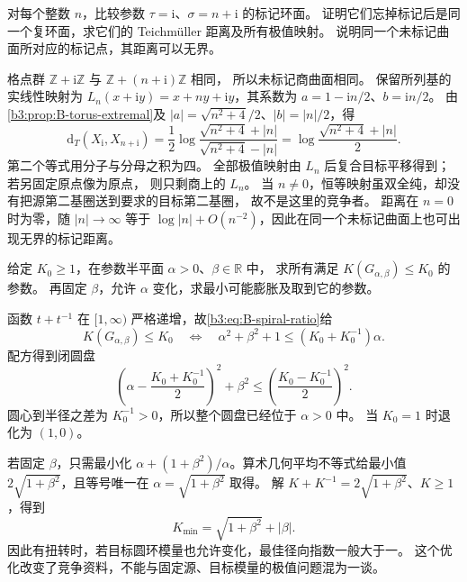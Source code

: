 \begin{exercise}\label{b3:ex:B-6}
对每个整数 \(n\)，比较参数 \(\tau=\mathrm i\)、\(\sigma=n+\mathrm i\) 的标记环面。
证明它们忘掉标记后是同一个复环面，求它们的 Teichmüller 距离及所有极值映射。
说明同一个未标记曲面所对应的标记点，其距离可以无界。
\end{exercise}
\begin{solution}
格点群 \(\mathbb Z+\mathrm i\mathbb Z\) 与 \(\mathbb Z+(n+\mathrm i)\mathbb Z\) 相同，
所以未标记商曲面相同。
保留所列基的实线性映射为
\(L_n(x+\mathrm i y)=x+ny+\mathrm i y\)，其系数为
\(a=1-\mathrm i n/2\)、\(b=\mathrm i n/2\)。
由\cref{b3:prop:B-torus-extremal}及 \(|a|=\sqrt{n^2+4}/2\)、\(|b|=|n|/2\)，得
\[
 \mathrm d_T(X_{\mathrm i},X_{n+\mathrm i})
 =\frac12\log\frac{\sqrt{n^2+4}+|n|}{\sqrt{n^2+4}-|n|}
 =\log\frac{\sqrt{n^2+4}+|n|}{2}.
\]
第二个等式用分子与分母之积为四。
全部极值映射由 \(L_n\) 后复合目标平移得到；若另固定原点像为原点，
则只剩商上的 \(L_n\)。
当 \(n\ne0\)，恒等映射虽双全纯，却没有把源第二基圈送到要求的目标第二基圈，
故不是这里的竞争者。
距离在 \(n=0\) 时为零，随 \(|n|\to\infty\) 等于
\(\log|n|+O(n^{-2})\)，因此在同一个未标记曲面上也可出现无界的标记距离。
\end{solution}

\begin{exercise}\label{b3:ex:B-7}
给定 \(K_0\ge1\)，在参数半平面 \(\alpha>0\)、\(\beta\in\mathbb R\) 中，
求所有满足 \(K(G_{\alpha,\beta})\le K_0\) 的参数。
再固定 \(\beta\)，允许 \(\alpha\) 变化，求最小可能膨胀及取到它的参数。
\end{exercise}
\begin{solution}
函数 \(t+t^{-1}\) 在 \([1,\infty)\) 严格递增，故\eqref{b3:eq:B-spiral-ratio}给
\[
 K(G_{\alpha,\beta})\le K_0
 \quad\Longleftrightarrow\quad
 \alpha^2+\beta^2+1\le(K_0+K_0^{-1})\alpha.
\]
配方得到闭圆盘
\[
 \left(\alpha-\frac{K_0+K_0^{-1}}2\right)^2+\beta^2
 \le\left(\frac{K_0-K_0^{-1}}2\right)^2.
\]
圆心到半径之差为 \(K_0^{-1}>0\)，所以整个圆盘已经位于 \(\alpha>0\) 中。
当 \(K_0=1\) 时退化为 \((1,0)\)。

若固定 \(\beta\)，只需最小化
\(\alpha+(1+\beta^2)/\alpha\)。算术几何平均不等式给最小值
\(2\sqrt{1+\beta^2}\)，且等号唯一在 \(\alpha=\sqrt{1+\beta^2}\) 取得。
解 \(K+K^{-1}=2\sqrt{1+\beta^2}\)、\(K\ge1\)，得到
\[
 K_{\min}=\sqrt{1+\beta^2}+|\beta|.
\]
因此有扭转时，若目标圆环模量也允许变化，最佳径向指数一般大于一。
这个优化改变了竞争资料，不能与固定源、目标模量的极值问题混为一谈。
\end{solution}

